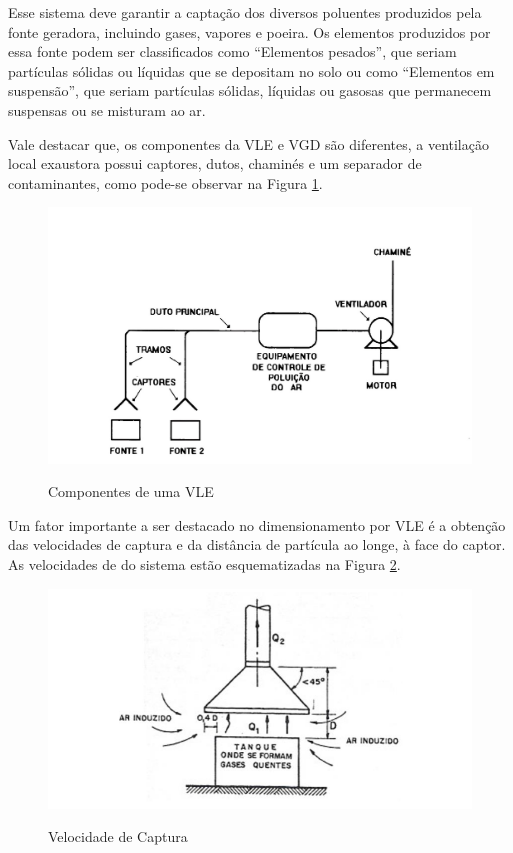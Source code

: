 \documentclass[acronym,symbols]{fei}
\begin{document}
Esse sistema deve garantir a captação dos diversos poluentes produzidos pela fonte geradora, incluindo gases, vapores e poeira. Os elementos produzidos por essa fonte podem ser classificados como “Elementos pesados”, que seriam partículas sólidas ou líquidas que se depositam no solo ou como “Elementos em suspensão”, que seriam partículas sólidas, líquidas ou gasosas que permanecem suspensas ou se misturam ao ar.

Vale destacar que, os componentes da VLE e VGD são diferentes, a ventilação local exaustora possui captores, dutos, chaminés e um separador de contaminantes, como pode-se observar na Figura \ref{fig: compnentes da VLE}.

 \begin{figure}[!htb] %
 \centering
    \caption{\centering Componentes de uma VLE}
    \includegraphics[width=0.7\linewidth]{Imagens/VLE.jpeg}
    \label{fig: compnentes da VLE}
 \end{figure}

Um fator importante a ser destacado no dimensionamento por VLE é a obtenção das velocidades de captura e da distância de partícula ao longe, à face do captor. As velocidades de do sistema estão esquematizadas na Figura \ref{fig: velocidade de captura}.

 \begin{figure}[!htb] 
 \centering
    \caption{\centering Velocidade de Captura}
    \includegraphics[width=0.8\linewidth]{Imagens/velocidade captura.png}
    \label{fig: velocidade de captura}
 \end{figure}
\end{document}
